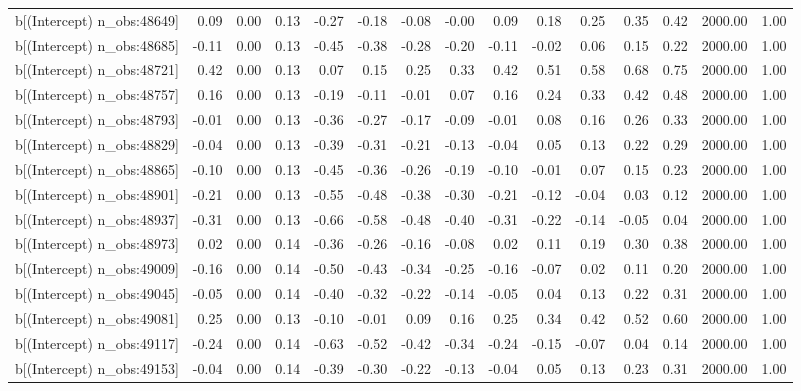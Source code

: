 \begin{table}[ht]
\begin{tabular}{rrrrrrrrrrrrrrr}
  b[(Intercept) n\_obs:48649] & 0.09 & 0.00 & 0.13 & -0.27 & -0.18 & -0.08 & -0.00 & 0.09 & 0.18 & 0.25 & 0.35 & 0.42 & 2000.00 & 1.00 \\ 
  b[(Intercept) n\_obs:48685] & -0.11 & 0.00 & 0.13 & -0.45 & -0.38 & -0.28 & -0.20 & -0.11 & -0.02 & 0.06 & 0.15 & 0.22 & 2000.00 & 1.00 \\ 
  b[(Intercept) n\_obs:48721] & 0.42 & 0.00 & 0.13 & 0.07 & 0.15 & 0.25 & 0.33 & 0.42 & 0.51 & 0.58 & 0.68 & 0.75 & 2000.00 & 1.00 \\ 
  b[(Intercept) n\_obs:48757] & 0.16 & 0.00 & 0.13 & -0.19 & -0.11 & -0.01 & 0.07 & 0.16 & 0.24 & 0.33 & 0.42 & 0.48 & 2000.00 & 1.00 \\ 
  b[(Intercept) n\_obs:48793] & -0.01 & 0.00 & 0.13 & -0.36 & -0.27 & -0.17 & -0.09 & -0.01 & 0.08 & 0.16 & 0.26 & 0.33 & 2000.00 & 1.00 \\ 
  b[(Intercept) n\_obs:48829] & -0.04 & 0.00 & 0.13 & -0.39 & -0.31 & -0.21 & -0.13 & -0.04 & 0.05 & 0.13 & 0.22 & 0.29 & 2000.00 & 1.00 \\ 
  b[(Intercept) n\_obs:48865] & -0.10 & 0.00 & 0.13 & -0.45 & -0.36 & -0.26 & -0.19 & -0.10 & -0.01 & 0.07 & 0.15 & 0.23 & 2000.00 & 1.00 \\ 
  b[(Intercept) n\_obs:48901] & -0.21 & 0.00 & 0.13 & -0.55 & -0.48 & -0.38 & -0.30 & -0.21 & -0.12 & -0.04 & 0.03 & 0.12 & 2000.00 & 1.00 \\ 
  b[(Intercept) n\_obs:48937] & -0.31 & 0.00 & 0.13 & -0.66 & -0.58 & -0.48 & -0.40 & -0.31 & -0.22 & -0.14 & -0.05 & 0.04 & 2000.00 & 1.00 \\ 
  b[(Intercept) n\_obs:48973] & 0.02 & 0.00 & 0.14 & -0.36 & -0.26 & -0.16 & -0.08 & 0.02 & 0.11 & 0.19 & 0.30 & 0.38 & 2000.00 & 1.00 \\ 
  b[(Intercept) n\_obs:49009] & -0.16 & 0.00 & 0.14 & -0.50 & -0.43 & -0.34 & -0.25 & -0.16 & -0.07 & 0.02 & 0.11 & 0.20 & 2000.00 & 1.00 \\ 
  b[(Intercept) n\_obs:49045] & -0.05 & 0.00 & 0.14 & -0.40 & -0.32 & -0.22 & -0.14 & -0.05 & 0.04 & 0.13 & 0.22 & 0.31 & 2000.00 & 1.00 \\ 
  b[(Intercept) n\_obs:49081] & 0.25 & 0.00 & 0.13 & -0.10 & -0.01 & 0.09 & 0.16 & 0.25 & 0.34 & 0.42 & 0.52 & 0.60 & 2000.00 & 1.00 \\ 
  b[(Intercept) n\_obs:49117] & -0.24 & 0.00 & 0.14 & -0.63 & -0.52 & -0.42 & -0.34 & -0.24 & -0.15 & -0.07 & 0.04 & 0.14 & 2000.00 & 1.00 \\ 
  b[(Intercept) n\_obs:49153] & -0.04 & 0.00 & 0.14 & -0.39 & -0.30 & -0.22 & -0.13 & -0.04 & 0.05 & 0.13 & 0.23 & 0.31 & 2000.00 & 1.00 \\ 

\end{tabular}
\end{table}
